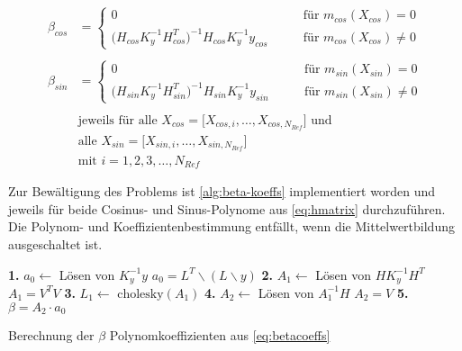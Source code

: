 \begin{align}\label{eq:betacoeffs}
	\beta_{cos} &= 
		\begin{cases}
			0 																	 &\qquad \text{für } m_{cos}(X_{cos}) = 0\\
			\big( H_{cos} K_y^{-1} H_{cos}^T \big)^{-1} H_{cos} K_y^{-1} y_{cos} &\qquad \text{für } m_{cos}(X_{cos}) \ne 0
		\end{cases} \nonumber \\
	\\
	\beta_{sin} &= 
		\begin{cases}
			0 																	 &\qquad \text{für } m_{sin}(X_{sin}) = 0\\
			\big( H_{sin} K_y^{-1} H_{sin}^T \big)^{-1} H_{sin} K_y^{-1} y_{sin} &\qquad \text{für } m_{sin}(X_{sin}) \ne 0
		\end{cases} \nonumber \\
	\nonumber \\
	& \text{jeweils für alle } X_{cos} = \big[ X_{cos,i},\dots, X_{cos,N_{Ref}} \big] \text{ und } \nonumber \\
	& \text{alle } X_{sin} = \big[ X_{sin,i},\dots, X_{sin,N_{Ref}} \big] \nonumber \\
	& \text{mit } i = 1,2,3,\ldots,N_{Ref} \nonumber
\end{align}


Zur Bewältigung des Problems ist \autoref{alg:beta-koeffs} implementiert worden und jeweils für beide Cosinus- und Sinus-Polynome aus \autoref{eq:hmatrix} durchzuführen. Die Polynom- und Koeffizientenbestimmung entfällt, wenn die Mittelwertbildung ausgeschaltet ist.


\begin{algorithm}[hp]
	\SetAlgoLined
	\textbf{1.} $a_0 \leftarrow$ Lösen von $K_y^{-1} y$\;
	\Indp 
		$a_0 = L^T \backslash (L \backslash y)$\;
	\Indm
	\textbf{2.} $A_1 \leftarrow$ Lösen von $H K_y^{-1} H^T$\;
	\Indp
		$A_1 = V^T V$\;
	\Indm
	\textbf{3.} $L_1 \leftarrow$ $\text{cholesky}(A_1)$\;
	\textbf{4.} $A_2 \leftarrow$ Lösen von $A_1^{-1} H$\;
	\Indp
		$A_2 = V$\;
	\Indm
	\textbf{5.} $\beta = A_2 \cdot a_0$\;
	\caption{Berechnung der $\beta$ Polynomkoeffizienten aus \autoref{eq:betacoeffs}}
	\label{alg:beta-koeffs}
\end{algorithm}


